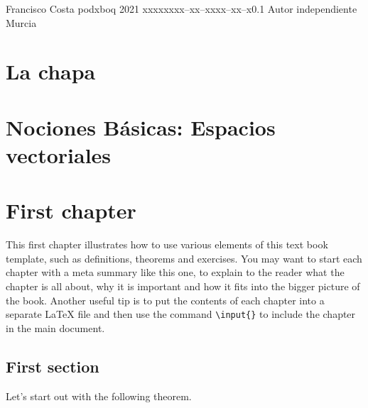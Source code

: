 \documentclass{tstextbook}
\begin{document}
    {Francisco Costa}
    {podxboq}
    {2021}
    {xxxxx}{xxx--xx--xxxx--xx--x}{0.1}
    {Autor independiente}
    {Murcia}

    \printglossaries

    \chapter{La chapa}\label{ch:la-chapa}
    

    \chapter{Nociones Básicas: Espacios vectoriales}\label{ch:basico-espacio-vectorial}
    

    \chapter{First chapter}

    \begin{summary}
        This first chapter illustrates how to use various elements of this
        text book template, such as definitions, theorems and exercises. You
        may want to start each chapter with a meta summary like this one, to
        explain to the reader what the chapter is all about, why it is
        important and how it fits into the bigger picture of the
        book. Another useful tip is to put the contents of each chapter into
        a separate \LaTeX{} file and then use the command
        \texttt{\textbackslash{}input\{\}} to include the chapter in the
        main document.
    \end{summary}


    \section{First section}

    Let's start out with the following theorem.
\end{document}
